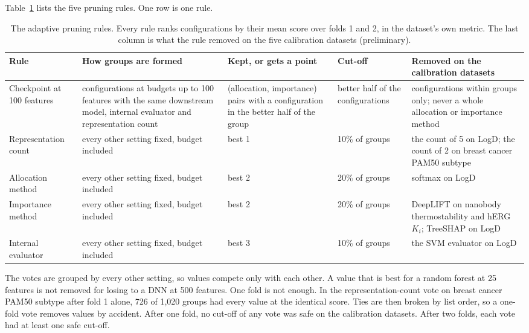 Table~\ref{tab:pruning_rules} lists the five pruning rules. One row is one rule.

\begin{table}[htbp]
\centering
\small
\caption{The adaptive pruning rules. Every rule ranks configurations by their mean score over folds 1 and 2, in the dataset's own metric. The last column is what the rule removed on the five calibration datasets (preliminary).}
\label{tab:pruning_rules}
\begin{tabular}{@{}p{2.2cm}p{3.4cm}p{2.8cm}p{1.6cm}p{3.6cm}@{}}
\toprule
Rule & How groups are formed & Kept, or gets a point & Cut-off & Removed on the calibration datasets \\
\midrule
Checkpoint at 100 features & configurations at budgets up to 100 features with the same downstream model, internal evaluator and representation count & (allocation, importance) pairs with a configuration in the better half of the group & better half of the configurations & configurations within groups only; never a whole allocation or importance method \\
\addlinespace
Representation count & every other setting fixed, budget included & best 1 & 10\% of groups & the count of 5 on LogD; the count of 2 on breast cancer PAM50 subtype \\
\addlinespace
Allocation method & every other setting fixed, budget included & best 2 & 20\% of groups & softmax on LogD \\
\addlinespace
Importance method & every other setting fixed, budget included & best 2 & 20\% of groups & DeepLIFT on nanobody thermostability and hERG $K_i$; TreeSHAP on LogD \\
\addlinespace
Internal evaluator & every other setting fixed, budget included & best 3 & 10\% of groups & the SVM evaluator on LogD \\
\bottomrule
\end{tabular}
\end{table}

The votes are grouped by every other setting, so values compete only with each other. A value that is best for a random forest at 25 features is not removed for losing to a DNN at 500 features. One fold is not enough. In the representation-count vote on breast cancer PAM50 subtype after fold 1 alone, 726 of 1,020 groups had every value at the identical score. Ties are then broken by list order, so a one-fold vote removes values by accident. After one fold, no cut-off of any vote was safe on the calibration datasets. After two folds, each vote had at least one safe cut-off.


